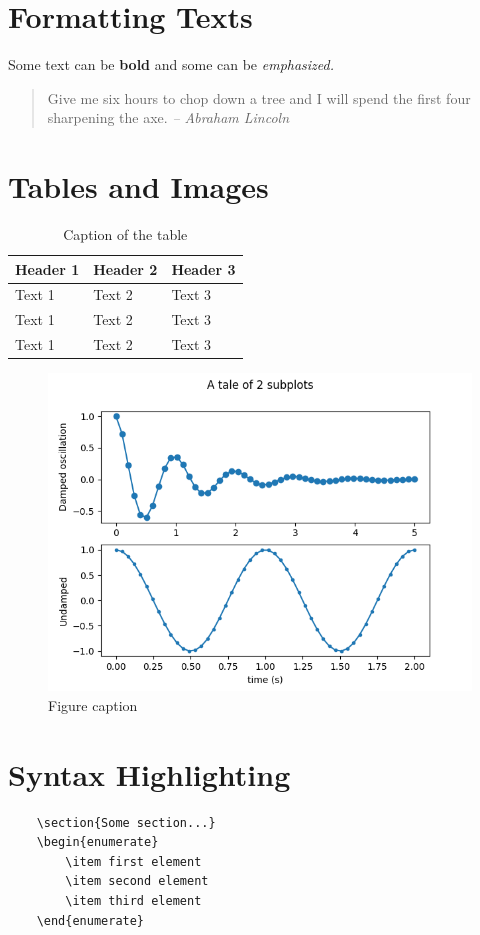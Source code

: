 \documentclass{article}
\theoremstyle{definition}
\begin{document}
\section{Formatting Texts}

Some text can be \textbf{bold} and some can be \emph{emphasized.}

\begin{quote}
	Give me six hours to chop down a tree and I will spend the first four sharpening the axe.  \emph{-- Abraham Lincoln}
\end{quote}

\section{Tables and Images}
\lipsum[12]

\begin{table}[h]
	\centering
	\caption{Caption of the table}
	\begin{tabular}{lll}
		\toprule 
	\textbf{Header 1} &\textbf{ Header 2} & \textbf{Header 3} \\
		\toprule
		Text 1 & Text 2 & Text 3 \\ 
		Text 1 & Text 2 & Text 3 \\ 
		Text 1 & Text 2 & Text 3 \\ \bottomrule
		
	\end{tabular}
\end{table}
\lipsum[75]

\begin{figure}[h]
	\centering
	\includegraphics[scale=.5]{img/image}
	\caption{Figure caption}
	
\end{figure}

\section{Syntax Highlighting}

\begin{verbatim}
	\section{Some section...}
	\begin{enumerate}
		\item first element
		\item second element
		\item third element
	\end{enumerate}
\end{verbatim}


	
\end{document}
